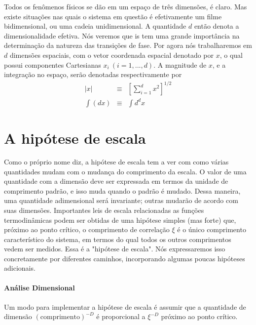 Todos os fenômenos físicos se dão em um espaço de três dimensões, é claro. Mas existe situações nas quais o sistema em questão é efetivamente um filme bidimensional, ou uma cadeia unidimensional. A quantidade $d$ então denota a dimensionalidade efetiva. Nós veremos que is tem uma grande importância na determinação da natureza das transições de fase. Por agora nós trabalharemos em $d$ dimensões espaciais, com o vetor coordenada espacial denotado por $x$, o qual possui componentes Cartesianas $x_{i}~(i=1,...,d)$. A magnitude de $x$, e a integração no espaço, serão denotadas respectivamente por
\begin{eqnarray}
|x| &\equiv& \left[ \sum_{i=1}^{d}x^{2} \right]^{1/2}
\nonumber \\
\int (dx) &\equiv& \int d^{d}x
\end{eqnarray}

\section{A hip\'otese de escala}
\noindent

Como o próprio nome diz, a hipótese de escala tem a ver com como várias quantidades mudam com o mudança do comprimento da escala. O valor de uma quantidade com a dimensão deve ser expressada em termos da unidade de comprimento padrão, e isso muda quando o padrão é mudado. Dessa maneira, uma quantidade adimensional será invariante; outras mudarão de acordo com suas dimensões. Importantes leis de escala relacionadas as funções termodinâmicas podem ser obtidas de uma hipótese simples (mas forte) que, próximo ao ponto crítico, o comprimento de correlação $\xi$ é o único comprimento característico do sistema, em termos do qual todos os outros comprimentos vedem ser medidos. Essa é a "hipótese de escala". Nós expressaremos isso concretamente por diferentes caminhos, incorporando algumas poucas hipóteses adicionais.\\
\\
\noindent
{\bf Análise Dimensional}\\
\\
Um modo para implementar a hipótese de escala é assumir que a quantidade de dimensão $(\text{comprimento})^{-D}$ é proporcional a $\xi^{-D}$ próximo ao ponto crítico.

